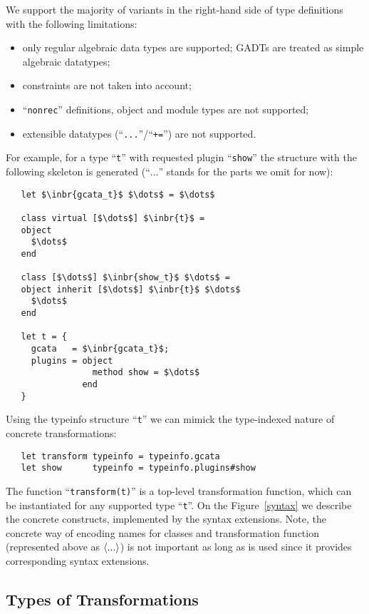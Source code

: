 We support the majority of variants in the right-hand side of type definitions with the following limitations:

\begin{itemize}
\item only regular algebraic data types are supported; GADTs are treated as simple algebraic datatypes;
\item constraints are not taken into account;
\item ``\lstinline{nonrec}'' definitions, object and module types are not supported;
\item extensible datatypes (``\lstinline{...}''/``\lstinline{+=}'') are not supported.
\end{itemize}

For example, for a type ``\lstinline{t}'' with requested plugin ``\lstinline{show}'' the structure with the following skeleton is generated (``$\dots$'' stands for the parts we omit for now):

\begin{lstlisting}
   let $\inbr{gcata_t}$ $\dots$ = $\dots$
   
   class virtual [$\dots$] $\inbr{t}$ =
   object
     $\dots$
   end

   class [$\dots$] $\inbr{show_t}$ $\dots$ =
   object inherit [$\dots$] $\inbr{t}$ $\dots$
     $\dots$
   end

   let t = {
     gcata   = $\inbr{gcata_t}$;
     plugins = object
                 method show = $\dots$
               end
   }
\end{lstlisting}

Using the typeinfo structure ``\lstinline{t}'' we can mimick the type-indexed nature of concrete transformations:

\begin{lstlisting}
   let transform typeinfo = typeinfo.gcata
   let show      typeinfo = typeinfo.plugins#show
\end{lstlisting}

The function ``\lstinline{transform(t)}'' is a top-level transformation function, which can be instantiated for any supported type ``\lstinline{t}''. On the
Figure~\ref{syntax} we describe the concrete constructs, implemented by the syntax extensions. Note, the concrete way of encoding names
for classes and transformation function (represented above as $\left<...\right>$) is not important as long as  is
used since it provides corresponding syntax extensions.

\subsection{Types of Transformations}

